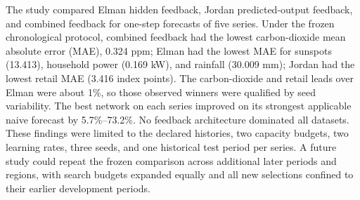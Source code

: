 The study compared Elman hidden feedback, Jordan predicted-output feedback, and combined feedback for one-step forecasts of five series. Under the frozen chronological protocol, combined feedback had the lowest carbon-dioxide mean absolute error (MAE), 0.324 ppm; Elman had the lowest MAE for sunspots (13.413), household power (0.169 kW), and rainfall (30.009 mm); Jordan had the lowest retail MAE (3.416 index points). The carbon-dioxide and retail leads over Elman were about 1\%, so those observed winners were qualified by seed variability. The best network on each series improved on its strongest applicable naive forecast by 5.7\%--73.2\%. No feedback architecture dominated all datasets. These findings were limited to the declared histories, two capacity budgets, two learning rates, three seeds, and one historical test period per series. A future study could repeat the frozen comparison across additional later periods and regions, with search budgets expanded equally and all new selections confined to their earlier development periods.
